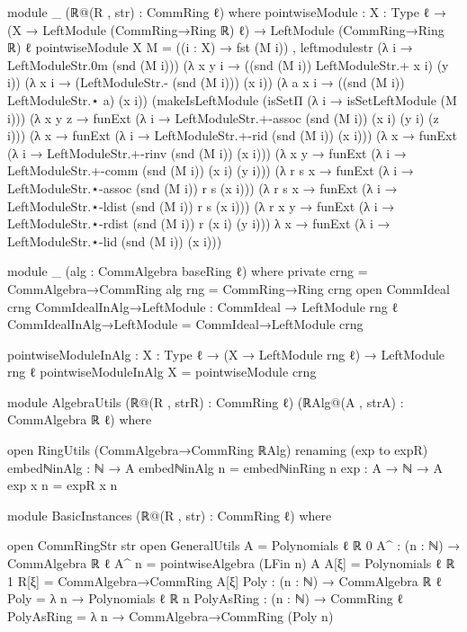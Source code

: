     module _ (ℝ@(R , str) : CommRing ℓ)  where
      pointwiseModule : {X : Type ℓ} → (X → LeftModule (CommRing→Ring ℝ) ℓ) → LeftModule (CommRing→Ring ℝ) ℓ
      pointwiseModule {X} M = ((i : X) → fst (M i)) , 
                                  leftmodulestr 
                                  (λ i → LeftModuleStr.0m (snd (M i))) 
                                  (λ x y i → ((snd (M i)) LeftModuleStr.+ x i) (y i)) 
                                  (λ x i → (LeftModuleStr.- (snd (M i))) (x i)) 
                                  (λ a x i → ((snd (M i)) LeftModuleStr.⋆ a) (x i)) 
                                  (makeIsLeftModule 
                                    (isSetΠ (λ i → isSetLeftModule (M i))) 
                                    (λ x y z → funExt (λ i → LeftModuleStr.+-assoc (snd (M i)) (x i) (y i) (z i))) 
                                    (λ x →     funExt (λ i →  LeftModuleStr.+-rid (snd (M i)) (x i))) 
                                    (λ x →     funExt (λ i →  LeftModuleStr.+-rinv (snd (M i)) (x i)))
                                    (λ x y →   funExt (λ i →  LeftModuleStr.+-comm (snd (M i)) (x i) (y i))) 
                                    (λ r s x → funExt (λ i → LeftModuleStr.⋆-assoc (snd (M i)) r s (x i))) 
                                    (λ r s x → funExt (λ i →  LeftModuleStr.⋆-ldist (snd (M i)) r s (x i))) 
                                    (λ r x y → funExt (λ i → LeftModuleStr.⋆-rdist (snd (M i)) r (x i) (y i))) 
                                    λ x →      funExt (λ i → LeftModuleStr.⋆-lid (snd (M i)) (x i)))
      
    module _ (alg : CommAlgebra baseRing ℓ) where
      private
        crng = CommAlgebra→CommRing alg
        rng = CommRing→Ring crng
      open CommIdeal crng
      CommIdealInAlg→LeftModule : CommIdeal → LeftModule rng ℓ
      CommIdealInAlg→LeftModule = CommIdeal→LeftModule crng

      pointwiseModuleInAlg : {X : Type ℓ} → (X → LeftModule rng ℓ) → LeftModule rng ℓ
      pointwiseModuleInAlg {X} = pointwiseModule crng

  module AlgebraUtils (ℝ@(R , strR) : CommRing ℓ) (ℝAlg@(A , strA) : CommAlgebra ℝ ℓ) where

    open RingUtils (CommAlgebra→CommRing ℝAlg) renaming (exp to expR)
    embedℕinAlg : ℕ → A
    embedℕinAlg n = embedℕinRing n
    exp : A → ℕ → A
    exp x n = expR x n

  module BasicInstances (ℝ@(R , str) : CommRing ℓ) where

    open CommRingStr str 
    open GeneralUtils
    A = Polynomials {ℓ} {ℝ} 0 
    A^ : (n : ℕ) → CommAlgebra ℝ ℓ
    A^ n = pointwiseAlgebra (LFin n) A
    A[ξ] = Polynomials {ℓ} {ℝ} 1
    R[ξ] = CommAlgebra→CommRing A[ξ] 
    Poly : (n : ℕ) → CommAlgebra ℝ ℓ
    Poly = λ n → Polynomials {ℓ} {ℝ} n
    PolyAsRing : (n : ℕ) → CommRing ℓ
    PolyAsRing = λ n → CommAlgebra→CommRing (Poly n) 

